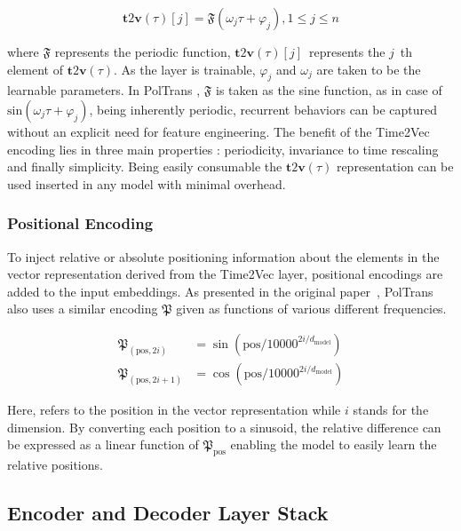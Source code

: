 \documentclass[10pt,journal]{IEEEtran}
\begin{document}
\begin{equation}
\mathbf{t} 2 \mathbf{v}(\tau)[j]=\mathfrak{F}\left(\omega_{j} \tau+\varphi_{j}\right), 1 \leq j \leq n
\end{equation}

where $\mathfrak{F}$ represents the periodic function, ${\mathbf{t} 2 \mathbf{v}(\tau)[j]}$~represents the ${j}$~th element of ${\mathbf{t} 2 \mathbf{v}(\tau)}$. As the layer is trainable, $\varphi_{j}$ and $\omega_{j}$ are taken to be the learnable parameters. In {PolTrans} , $\mathfrak{F}$ is taken as the sine function, as in case of ${\textrm{sin}\left(\omega_{j} \tau+\varphi_{j}\right)}$, being inherently periodic, recurrent behaviors can be captured without an explicit need for feature engineering. The benefit of the Time2Vec encoding lies in three main properties :  periodicity, invariance to time rescaling and finally simplicity. Being easily consumable the ${\mathbf{t} 2 \mathbf{v}(\tau)}$ representation can be used inserted in any model with minimal overhead. 

\subsubsection{Positional Encoding} 
To inject relative or absolute positioning information about the elements in the vector representation derived from the Time2Vec layer, positional encodings are added to the input embeddings. As presented in the original paper~\cite{Vaswani.2017}, {PolTrans}  also uses a similar encoding $\mathfrak{P}$ given as functions of various different frequencies. 

\begin{equation}
\begin{aligned}
\mathfrak{P}_{(\text{pos}, 2 i)} &=\sin \left(\text{pos} / 10000^{2 i / d_{\text{model}}}\right) \\
\mathfrak{P}_{(\text{pos}, 2 i+1)} &=\cos \left(\text{pos} / 10000^{2 i / d_{\text{model}}}\right)
\end{aligned}
\end{equation}

Here,  refers to the position in the vector representation while ${i}$ stands for the dimension. By converting each position to a sinusoid, the relative difference can be expressed as a linear function of $\mathfrak{P}_{\text{pos}}$ enabling the model to easily learn the relative positions.


\subsection{Encoder and Decoder Layer Stack}
\end{document}
